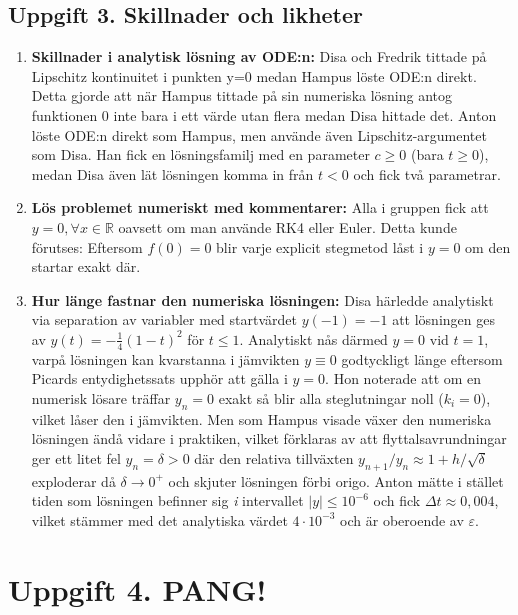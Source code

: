 \documentclass{article}
\begin{document}
\subsection*{Uppgift 3. Skillnader och likheter}

\begin{enumerate}
    \item \textbf{Skillnader i analytisk lösning av ODE:n:} 
    Disa och Fredrik tittade på Lipschitz kontinuitet i punkten y=0 medan Hampus löste ODE:n direkt. Detta gjorde att när Hampus tittade på sin numeriska lösning antog funktionen 0 inte bara i ett värde utan flera medan Disa hittade det. Anton löste ODE:n direkt som Hampus, men använde även Lipschitz-argumentet
    som Disa. Han fick en lösningsfamilj med en parameter $c \geq 0$ (bara
    $t \geq 0$), medan Disa även lät lösningen komma in från $t < 0$ och fick två
    parametrar. 
    
    \item \textbf{Lös problemet numeriskt med kommentarer:} Alla i gruppen fick att $y=0, \forall x\in \mathbb{R}$ oavsett om man använde RK4 eller Euler. Detta kunde förutses: Eftersom
    $f(0) = 0$ blir varje explicit stegmetod låst i $y = 0$ om den startar exakt där.
    \item \textbf{Hur länge fastnar den numeriska lösningen:} Disa härledde analytiskt via separation av variabler med startvärdet $y(-1) = -1$ att lösningen ges av $y(t) = -\frac{1}{4}(1-t)^2$ för $t \le 1$. Analytiskt nås därmed $y = 0$ vid $t = 1$, varpå lösningen kan kvarstanna i jämvikten $y \equiv 0$ godtyckligt länge eftersom Picards entydighetssats upphör att gälla i $y = 0$. Hon noterade att om en numerisk lösare träffar $y_n = 0$ exakt så blir alla steglutningar noll ($k_i = 0$), vilket låser den i jämvikten. Men som Hampus visade växer den numeriska lösningen ändå vidare i praktiken, vilket förklaras av att flyttalsavrundningar ger ett litet fel $y_n = \delta > 0$ där den relativa tillväxten $y_{n+1}/y_n \approx 1 + h/\sqrt{\delta}$ exploderar då $\delta \to 0^+$ och skjuter lösningen förbi origo. Anton mätte i stället tiden som lösningen befinner sig \emph{i} intervallet $|y| \leq 10^{-6}$ och fick $\Delta t \approx 0{,}004$, vilket stämmer med det analytiska värdet $4 \cdot 10^{-3}$ och är oberoende av $\varepsilon$.
\end{enumerate}

\section*{Uppgift 4. PANG!}
\end{document}
